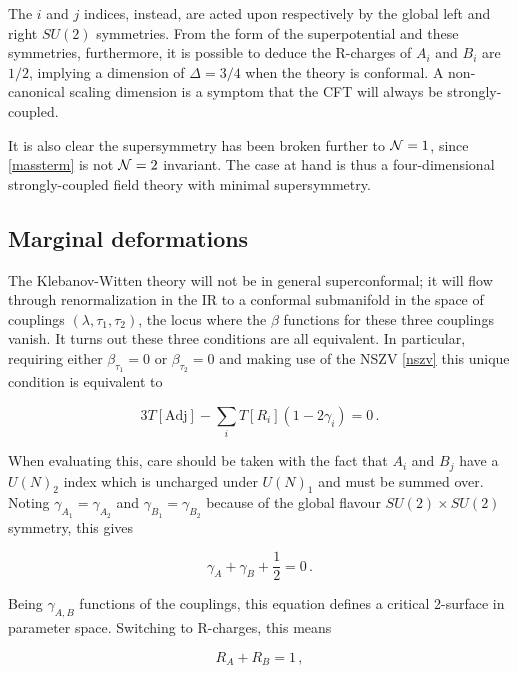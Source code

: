 The $i$ and $j$ indices, instead, are acted upon respectively by the global left and right $SU(2)$ symmetries. From the form of the superpotential and these symmetries, furthermore, it is possible to deduce the R-charges of $A_i$ and $B_i$ are $1/2$, implying a dimension of $\Delta = 3/4$ when the theory is conformal. A non-canonical scaling dimension is a symptom that the CFT will always be strongly-coupled.

It is also clear the supersymmetry has been broken further to $\mathcal{N} = 1$, since \eqref{massterm} is not $\mathcal{N} = 2$ invariant. The case at hand is thus a four-dimensional strongly-coupled field theory with minimal supersymmetry.

\subsection{Marginal deformations}

The Klebanov-Witten theory will not be in general superconformal; it will flow through renormalization in the IR to a conformal submanifold in the space of couplings $(\lambda,\tau_1,\tau_2)$, the locus where the $\beta$ functions for these three couplings vanish. It turns out these three conditions are all equivalent. In particular, requiring either $\beta_{\tau_1} = 0$ or $\beta_{\tau_2} = 0$ and making use of the NSZV \eqref{nszv} this unique condition is equivalent to

\begin{equation}
	3 T[\mathrm{Adj}] - \sum_i T[R_i] ( 1- 2\gamma_i) = 0\,.
	\label{}
\end{equation}

When evaluating this, care should be taken with the fact that $A_i$ and $B_j$ have a $U(N)_2$ index which is uncharged under $U(N)_1$ and must be summed over. Noting $\gamma_{A_1} = \gamma_{A_2}$ and $\gamma_{B_1} = \gamma_{B_2}$ because of the global flavour $SU(2)\times SU(2)$ symmetry, this gives

\begin{equation}
	\gamma_A + \gamma_B + \frac{1}{2} = 0\,.
	\label{}
\end{equation}

Being $\gamma_{A,B}$ functions of the couplings, this equation defines a critical 2-surface in parameter space. Switching to R-charges, this means

\begin{equation}
	R_A + R_B = 1\,,
	\label{}
\end{equation}

